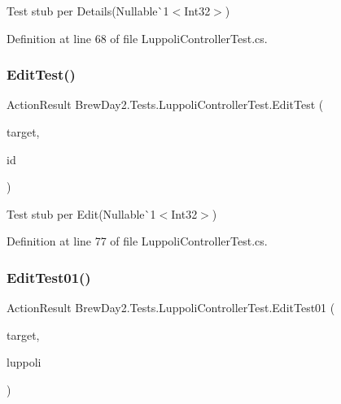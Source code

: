 Test stub per Details(Nullable\`{}1$<$Int32$>$)



Definition at line 68 of file Luppoli\+Controller\+Test.\+cs.

\mbox{\label{class_brew_day2_1_1_tests_1_1_luppoli_controller_test_a81bf77eb8c8134d81a21da77bb1d2745}} 
\subsubsection{\texorpdfstring{Edit\+Test()}{EditTest()}}
{\footnotesize\ttfamily Action\+Result Brew\+Day2.\+Tests.\+Luppoli\+Controller\+Test.\+Edit\+Test (\begin{DoxyParamCaption}\item[{\mbox{[}\+Pex\+Assume\+Under\+Test\mbox{]} \mbox{\hyperlink{class_brew_day2_1_1_controllers_1_1_luppoli_controller}{Luppoli\+Controller}}}]{target,  }\item[{int?}]{id }\end{DoxyParamCaption})}



Test stub per Edit(Nullable\`{}1$<$Int32$>$)



Definition at line 77 of file Luppoli\+Controller\+Test.\+cs.

\mbox{\label{class_brew_day2_1_1_tests_1_1_luppoli_controller_test_ab50c36017edf6a95f6d877a453a57399}} 
\subsubsection{\texorpdfstring{Edit\+Test01()}{EditTest01()}}
{\footnotesize\ttfamily Action\+Result Brew\+Day2.\+Tests.\+Luppoli\+Controller\+Test.\+Edit\+Test01 (\begin{DoxyParamCaption}\item[{\mbox{[}\+Pex\+Assume\+Under\+Test\mbox{]} \mbox{\hyperlink{class_brew_day2_1_1_controllers_1_1_luppoli_controller}{Luppoli\+Controller}}}]{target,  }\item[{\mbox{\hyperlink{class_brew_day2_1_1_models_1_1_luppoli}{Luppoli}}}]{luppoli }\end{DoxyParamCaption})}



